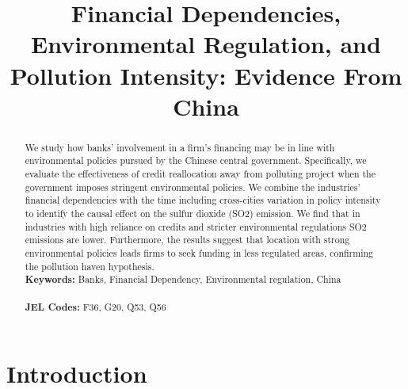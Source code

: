 \documentclass[12pt]{article}
\begin{document}
\begin{titlepage}

\title{Financial Dependencies, Environmental Regulation, and Pollution Intensity: Evidence From China}

\date{}

\maketitle
\begin{abstract}
\noindent We study how banks' involvement in a firm's financing may be in line with environmental policies pursued by the Chinese central government. Specifically, we evaluate the effectiveness of credit reallocation away from polluting project when the government imposes stringent environmental policies. We combine the industries' financial dependencies with the time including cross-cities variation in policy intensity to identify the causal effect on the sulfur dioxide (SO2) emission. We find that in industries with high reliance on credits and stricter environmental regulations SO2 emissions are lower. Furthermore, the results suggest that location with strong environmental policies leads firms to seek funding in less regulated areas, confirming the pollution haven hypothesis.
\vspace{0em}\\
\noindent\textbf{Keywords:} Banks, Financial Dependency, Environmental regulation, China\\
\vspace{0em}\\
\noindent\textbf{JEL Codes:} F36, G20, Q53, Q56\\

\bigskip
\end{abstract}
\setcounter{page}{0}
\thispagestyle{empty}
\end{titlepage}
\pagebreak \newpage

\doublespacing

\section{Introduction} \label{sec:introduction}
\end{document}
